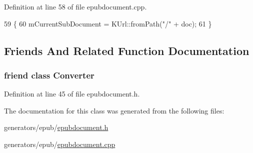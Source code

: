 Definition at line 58 of file epubdocument.\+cpp.


\begin{DoxyCode}
59 \{
60   mCurrentSubDocument = KUrl::fromPath(\textcolor{stringliteral}{"/"} + doc);
61 \}
\end{DoxyCode}


\subsection{Friends And Related Function Documentation}
\hypertarget{classEpub_1_1EpubDocument_aa98b6fcd5fef1695696973c9f993323d}{
\subsubsection[{Converter}]{\setlength{\rightskip}{0pt plus 5cm}friend class {\bf Converter}\hspace{0.3cm}{\ttfamily [friend]}}}\label{classEpub_1_1EpubDocument_aa98b6fcd5fef1695696973c9f993323d}


Definition at line 45 of file epubdocument.\+h.



The documentation for this class was generated from the following files\+:\begin{DoxyCompactItemize}
\item 
generators/epub/\hyperlink{epubdocument_8h}{epubdocument.\+h}\item 
generators/epub/\hyperlink{epubdocument_8cpp}{epubdocument.\+cpp}\end{DoxyCompactItemize}
